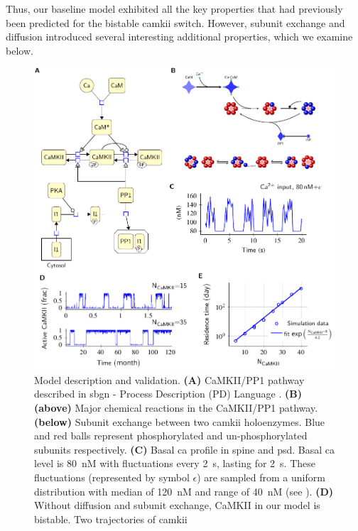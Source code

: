 \documentclass[9pt,lineno,doublespacing]{elife}
\begin{document}
Thus, our baseline model exhibited all the key properties that had
previously been predicted for the bistable \gls{camkii} switch. However, 
subunit exchange and diffusion introduced several interesting additional
properties, which we examine below.

\begin{figure}[t]%
    \includegraphics[width=0.95\linewidth]{./PaperFigures/elifeFigure1/figure_validation_178mm.pdf}
    \caption{Model description and validation. \textbf{(A)} CaMKII/PP1 pathway
        described in \gls{sbgn} - Process Description (PD) Language
        \citep{novere_systems_2009}. \textbf{(B)} \textbf{(above)} Major
        chemical reactions in the CaMKII/PP1 pathway. \textbf{(below)} Subunit
        exchange between two \gls{camkii} holoenzymes. Blue and red balls
        represent phosphorylated and un-phosphorylated subunits respectively.
        \textbf{(C)} Basal \gls{ca} profile in spine and \gls{psd}. Basal
        \gls{ca} level is \SI{80}{\nano M} with fluctuations every
        \SI{2}{\second}, lasting for \SI{2}{\second}. These fluctuations
        (represented by symbol $\epsilon$) are sampled from a uniform distribution with median of
        \SI{120}{\nano M} and range of \SI{40}{\nano M} (see
        ). \textbf{(D)} Without diffusion and subunit exchange,
        CaMKII in our model is bistable. Two trajectories of \gls{camkii}
}
\end{figure}
\end{document}
